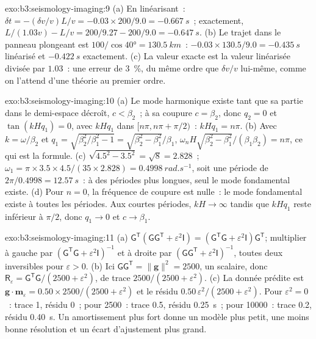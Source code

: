 \begin{solution}{exo:b3:seismology-imaging:9}
(a) En linéarisant~: $\delta t = -(\delta v/v)L/v = -0.03\times200/9.0 =
\qty{-0.667}{s}$~; exactement, $L/(1.03v) - L/v = 200/9.27 - 200/9.0 =
\qty{-0.647}{s}$. (b) Le trajet dans le panneau plongeant est $100/\cos\ang{40} =
\qty{130.5}{km}$~: $-0.03\times130.5/9.0 = \qty{-0.435}{s}$ linéarisé et
$\qty{-0.422}{s}$ exactement. (c) La valeur exacte est la valeur linéarisée divisée par
$1.03$~: une erreur de \qty{3}{\percent}, du même ordre que $\delta v/v$ lui-même, comme
on l'attend d'une théorie au premier ordre.
\end{solution}

\begin{solution}{exo:b3:seismology-imaging:10}
(a) Le mode harmonique existe tant que sa partie dans le demi-espace décroît, $c < \beta_2$~; à sa
coupure $c = \beta_2$, donc $q_2 = 0$ et $\tan(kHq_1) = 0$, avec $kHq_1$ dans
$[n\pi, n\pi + \pi/2)$~: $kHq_1 = n\pi$. (b) Avec $k = \omega/\beta_2$ et
$q_1 = \sqrt{\beta_2^2/\beta_1^2 - 1} = \sqrt{\beta_2^2 - \beta_1^2}/\beta_1$,
$\omega_nH\sqrt{\beta_2^2 - \beta_1^2}/(\beta_1\beta_2) = n\pi$, ce qui est la
formule. (c) $\sqrt{4.5^2 - 3.5^2} = \sqrt8 = 2.828$~; $\omega_1 =
\pi\times3.5\times4.5/(35\times2.828) = \qty{0.4998}{rad.s^{-1}}$, soit une période de
$2\pi/0.4998 = \qty{12.57}{s}$~: à des périodes plus longues, seul le mode fondamental
existe. (d) Pour $n = 0$, la fréquence de coupure est nulle~: le mode fondamental
existe à toutes les périodes. Aux courtes périodes, $kH \to \infty$ tandis que $kHq_1$ reste
inférieur à $\pi/2$, donc $q_1 \to 0$ et $c \to \beta_1$.
\end{solution}

\begin{solution}{exo:b3:seismology-imaging:11}
(a) $\mathsf G^{\mathsf T}(\mathsf G\mathsf G^{\mathsf T} + \varepsilon^2\mathsf I)
= (\mathsf G^{\mathsf T}\mathsf G + \varepsilon^2\mathsf I)\mathsf G^{\mathsf T}$;
multiplier à gauche par $(\mathsf G^{\mathsf T}\mathsf G + \varepsilon^2
\mathsf I)^{-1}$ et à droite par $(\mathsf G\mathsf G^{\mathsf T} +
\varepsilon^2\mathsf I)^{-1}$, toutes deux inversibles pour $\varepsilon > 0$.
(b) Ici $\mathsf G\mathsf G^{\mathsf T} = \|\mathbf g\|^2 = 2500$, un scalaire,
donc $\mathsf R_\varepsilon = \mathsf G^{\mathsf T}\mathsf G/(2500 + \varepsilon^2)$,
de trace $2500/(2500 + \varepsilon^2)$. (c) La donnée prédite est
$\mathbf g\cdot\mathbf m_\varepsilon = 0.50\times2500/(2500 + \varepsilon^2)$
et le résidu $0.50\,\varepsilon^2/(2500 + \varepsilon^2)$. Pour
$\varepsilon^2 = 0$~: trace 1, résidu 0~; pour 2500~: trace 0.5, résidu
\qty{0.25}{s}~; pour \num{10000}~: trace 0.2, résidu \qty{0.40}{s}. Un amortissement plus fort
donne un modèle plus petit, une moins bonne résolution et un écart d'ajustement plus grand.
\end{solution}

